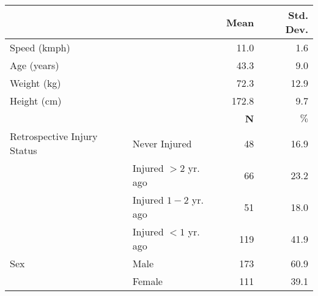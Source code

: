 \begin{table}
\centering
\begin{tabular}[t]{llrr}
\toprule
  &    & \textbf{Mean} & \textbf{Std. Dev.}\\
\midrule
Speed (kmph) &  & 11.0 & 1.6\\
Age (years) &  & 43.3 & 9.0\\
Weight (kg) &  & 72.3 & 12.9\\
Height (cm) &  & 172.8 & 9.7\\
\midrule
 &  & \textbf{N} & $\%$\\
Retrospective Injury Status & Never Injured & 48 & 16.9\\
 & Injured $>2$ yr. ago & 66 & 23.2\\
 & Injured $1-2$ yr. ago & 51 & 18.0\\
 & Injured $<1$ yr. ago & 119 & 41.9\\
Sex & Male & 173 & 60.9\\
 & Female & 111 & 39.1\\
\bottomrule
\end{tabular}
\end{table}
